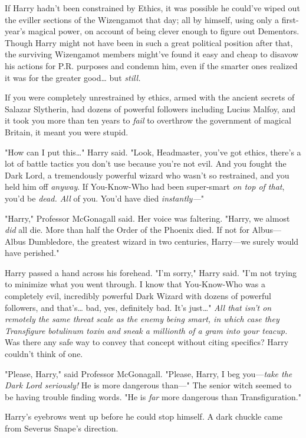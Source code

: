 If Harry hadn't been constrained by Ethics, it was possible he could've wiped
out the eviller sections of the Wizengamot that day; all by himself, using only
a first-year's magical power, on account of being clever enough to figure out
Dementors. Though Harry might not have been in such a great political position
after that, the surviving Wizengamot members might've found it easy and cheap
to disavow his actions for P.R. purposes and condemn him, even if the smarter
ones realized it was for the greater good{\ldots} but \emph{still.}

If you were completely unrestrained by ethics, armed with the ancient secrets
of Salazar Slytherin, had dozens of powerful followers including Lucius Malfoy,
and it took you more than ten years to \emph{fail} to overthrow the government
of magical Britain, it meant you were stupid.

"How can I put this{\ldots}" Harry said. "Look, Headmaster, you've got ethics,
there's a lot of battle tactics you don't use because you're not evil. And you
fought the Dark Lord, a tremendously powerful wizard who wasn't so restrained,
and you held him off \emph{anyway}. If You-Know-Who had been super-smart
\emph{on top of that}, you'd be \emph{dead. All} of you. You'd have died
\emph{instantly---}"

"Harry," Professor McGonagall said. Her voice was faltering. "Harry, we almost
\emph{did} all die. More than half the Order of the Phoenix died. If not for
Albus---Albus Dumbledore, the greatest wizard in two centuries, Harry---we
surely would have perished."

Harry passed a hand across his forehead. "I'm sorry," Harry said. "I'm not
trying to minimize what you went through. I know that You-Know-Who was a
completely evil, incredibly powerful Dark Wizard with dozens of powerful
followers, and that's{\ldots} bad, yes, definitely bad. It's just{\ldots}"
\emph{All that isn't on remotely the same threat scale as the enemy being
smart, in which case they Transfigure botulinum toxin and sneak a millionth of
a gram into your teacup.} Was there any safe way to convey that concept without
citing specifics? Harry couldn't think of one.

"Please, Harry," said Professor McGonagall. "Please, Harry, I beg
you---\emph{take the Dark Lord seriously!} He is more dangerous than---" The
senior witch seemed to be having trouble finding words. "He is \emph{far} more
dangerous than Transfiguration."

Harry's eyebrows went up before he could stop himself. A dark chuckle came from
Severus Snape's direction.

